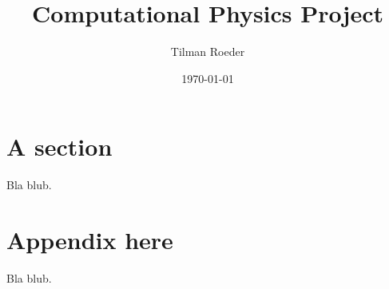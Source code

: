 \documentclass[10pt, a4paper]{article}
\title{Computational Physics Project}
\author{Tilman Roeder}
\date{\today}
\begin{document}
\maketitle

\section{A section}
Bla blub.

{}


\appendix{}

\section{Appendix here}
Bla blub.
\end{document}
